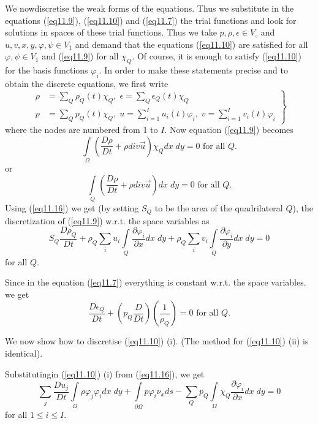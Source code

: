 We now\pageoriginale discretise the weak forms of the equations. Thus
we substitute in the equations (\ref{eq11.9}), (\ref{eq11.10}) and
(\ref{eq11.7}) the trial functions and look for solutions in spaces of
these trial functions. Thus we take $p, \rho, \epsilon \in V_\circ$
and $u,v,x,y, \varphi, \psi \in V_1$ and demand that the equations
(\ref{eq11.10}) are satisfied for all $\varphi, \psi \in V_1$ and
(\ref{eq11.9}) for all $\chi_Q$. Of course, it is enough to satisfy
(\ref{eq11.10}) for the basis functions $\varphi_i$. In order to make
these statements precise and to obtain the discrete equations, we
first write  
\begin{equation*}
\left. 
\begin{aligned}
\rho & = \sum\limits_Q \rho_Q(t) \chi_Q, \; \epsilon = \sum\limits_Q \epsilon_Q (t) \chi_Q\\
p & = \sum\limits_Q p_Q(t) \chi_Q, \; u = \sum\limits^I_{i=1} u_i (t) \varphi_i, \; v = \sum\limits^I_{i=1} v_i (t) \varphi_i
\end{aligned}
\right\}
\tag{11.16}\label{eq11.16}
\end{equation*}
 where the nodes are numbered from 1 to $I$. Now equation
 (\ref{eq11.9}) becomes 
$$
\int\limits_\Omega \left(\frac{D\rho}{Dt} + \rho div \vec{u}\right)
\chi_Q dx \; dy = 0 \text{ for all } Q.  
$$
or 
$$
\int\limits_Q \left(\frac{D\rho}{Dt} + \rho div \vec{u}\right) dx \; dy = 0
\text{ for all } Q.  
$$
Using (\ref{eq11.16}) we get (by setting $S_Q$ to be the area of the
quadrilateral $Q$), the discretization of (\ref{eq11.9}) w.r.t. the
space variables as  
\begin{equation*}
S_Q \frac{D\rho_Q}{Dt} + \rho_Q \sum\limits_i u_i \int\limits_Q
\frac{\partial \varphi_i}{\partial x} dx \; dy + \rho_Q \sum\limits_i
v_i \int\limits_Q \frac{\partial \varphi_i}{\partial y} dx \; dy =  0
\tag{11.17}\label{eq11.17} 
\end{equation*}
for all $Q$.

Since in the equation (\ref{eq11.7}) everything is constant w.r.t. the
space variables. we get  
\begin{equation*}
  \frac{D\epsilon_Q}{Dt} + \left(p_Q \frac{D}{Dt}\right)
  \left(\frac{1}{\rho_Q}\right) = 0 
  \text{ for all } Q.  \tag{11.18}\label{eq11.18} 
\end{equation*}

We now show how to discretise (\ref{eq11.10}) (i). (The method for
(\ref{eq11.10}) (ii) is identical).  

Substituting\pageoriginale in (\ref{eq11.10}) (i) from (\ref{eq11.16}), we get
\begin{equation*}
\sum\limits_j \frac{Du_j}{Dt} \int\limits_\Omega \rho \varphi_j \varphi_i dx \; dy + \int\limits_{\partial \Omega} p \varphi_i \nu_x ds - \sum\limits_Q p_Q \int\limits_\Omega \chi_Q  \frac{\partial \varphi_i}{\partial x} dx \; dy = 0
\tag{11.19}\label{eq11.19}
\end{equation*}
for all $1\leq i \leq I$.


